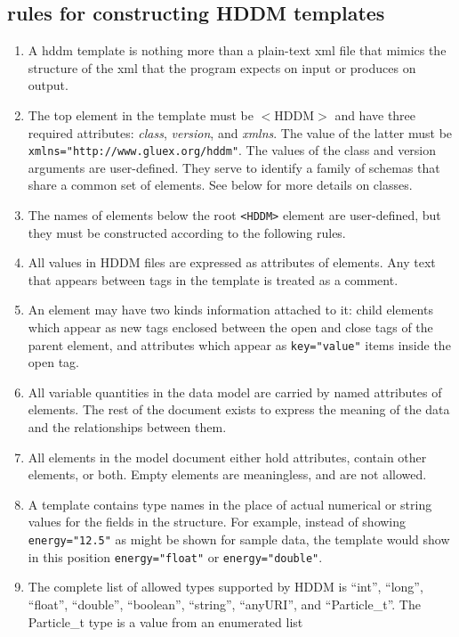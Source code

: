 \documentclass{revtex4}
\begin{document}
\subsection{rules for constructing HDDM templates}
\begin{enumerate}
\item  A hddm template is nothing more than a plain-text xml file that mimics 
the structure of the xml that the program expects on input or produces on output.
\item  The top element in the template must be $<$HDDM$>$ and have three required 
attributes: {\em class}, {\em version}, and {\em xmlns}.
The value of the latter must be \texttt{xmlns="http://www.gluex.org/hddm"}.
The values of the class and version arguments are user-defined. They serve to
identify a family of schemas that share a common set of elements. See below for
more details on classes. 
\item  The names of elements below the root \texttt{<HDDM>} element are
user-defined, but they must be constructed according to the following rules. 
\item  All values in HDDM files are expressed as attributes of elements.
Any text that appears between tags in the template is treated as a comment.
\item  An element may have two kinds information attached to it: child
elements which appear as new tags enclosed between the open and close tags
of the parent element, and attributes which appear as \texttt{key="value"}
items inside the open tag. 
\item  All variable quantities in the data model are carried by named
attributes of elements. The rest of the document exists to express the
meaning of the data and the relationships between them. 
\item  All elements in the model document either hold attributes, contain
other elements, or both. Empty elements are meaningless, and are not allowed. 
\item  A template contains type names in the place of actual numerical or
string values for the fields in the structure. For example, instead of
showing \texttt{energy="12.5"} as might be shown for sample data, the
template would show in this position \texttt{energy="float"} or
\texttt{energy="double"}.
\item  The complete list of allowed types supported by HDDM is ``int'',
``long'', ``float'', ``double'', ``boolean'', ``string'', ``anyURI'', and
``Particle\_t''. The Particle\_t type is a value from an enumerated list

\end{enumerate}
\end{document}
